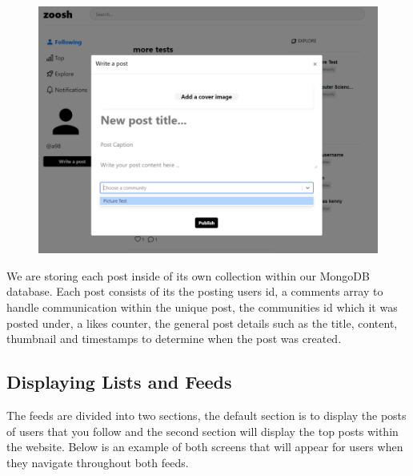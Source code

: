 \begin{figure}[H]
  \centering
  \includegraphics[scale=0.35]{img/createpost.PNG}
  \label{fig:Create Post Modal.}
\end{figure}

We are storing each post inside of its own collection within our MongoDB database. Each post consists of its the posting users id, a comments array to handle communication within the unique post, the communities id which it was posted under, a likes counter, the general post details such as the title, content, thumbnail and timestamps to determine when the post was created. 

\newpage
\subsection{Displaying Lists and Feeds}

The feeds are divided into two sections, the default section is to display the posts of users that you follow and the second section will display the top posts within the website. Below is an example of both screens that will appear for users when they navigate throughout both feeds.

